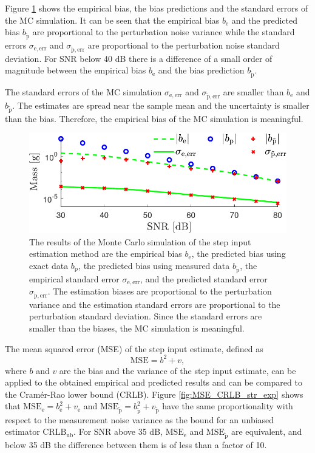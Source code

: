 Figure \ref{bias_sigma_sim_unstr_str_n2} shows the empirical bias, the bias predictions and the standard errors of the MC simulation.
It can be seen that the empirical bias $b_\mathrm{e}$ and the predicted bias $b_{\widetilde{\mathrm{p}}}$ are proportional to the perturbation noise variance while the standard errors $\sigma_\mathrm{e,err}$ and $\sigma_{\widetilde{\mathrm{p}}\mathrm{,err}}$ are proportional to the perturbation noise standard deviation.
For SNR below 40 dB there is a difference of a small order of magnitude between the empirical bias $b_\mathrm{e}$ and the bias prediction $b_{\widetilde{\mathrm{p}}}$. 

The standard errors of the MC simulation $\sigma_\mathrm{e,err}$ and $\sigma_{\widetilde{\mathrm{p}}\mathrm{,err}}$ are smaller than  $b_\mathrm{e}$ and $b_{\widetilde{\mathrm{p}}}$.
The estimates are spread near the sample mean and the uncertainty is smaller than the bias. 
Therefore, the empirical bias of the MC simulation is meaningful.

\begin{figure}[!htb]
\centering
\includegraphics[width=0.69\columnwidth]{./ChapterExperimentalValidation/fig/Fig_2.pdf} 
\caption{ \label{bias_sigma_sim_unstr_str_n2} 
The results of the Monte Carlo simulation of the step input estimation method are the empirical bias $b_{\mathrm{e}}$, the predicted bias using exact data $b_{\mathrm{p}}$, the predicted bias using measured data $b_{\widetilde{\mathrm{p}}}$, the empirical standard error $\sigma_{\mathrm{e,err}}$, and the predicted standard error $\sigma_{\widetilde{\mathrm{p}}\mathrm{,err}}$. The estimation biases are proportional to the perturbation variance and the estimation standard errors are proportional to the perturbation standard deviation. Since the standard errors are smaller than the biases, the MC simulation is meaningful.  }
\end{figure}

The mean squared error (MSE) of the step input estimate, defined as
\begin{equation} \mathrm{MSE} = b^2 + v,   \end{equation}
where $b$ and $v$ are the bias and the variance of the step input estimate, can be applied to the obtained empirical and predicted results and can be compared to the Cram\'er-Rao lower bound (CRLB).
Figure \ref{fig:MSE_CRLB_str_exp} shows that $\mathrm{MSE}_\mathrm{e} = b_\mathrm{e}^2 + v_\mathrm{e}$ and $\mathrm{MSE}_{\widetilde{\mathrm{p}}}  = b_{\widetilde{\mathrm{p}}}^2 + v_{\widetilde{\mathrm{p}}}$ have the same proportionality with respect to the measurement noise variance as the bound for an unbiased estimator $\mathrm{CRLB_{ub}}$.
For SNR above 35 dB, $\mathrm{MSE}_\mathrm{e}$ and $\mathrm{MSE}_{\widetilde{\mathrm{p}}}$ are equivalent, and below 35 dB the difference between them is of less than a factor of 10.

